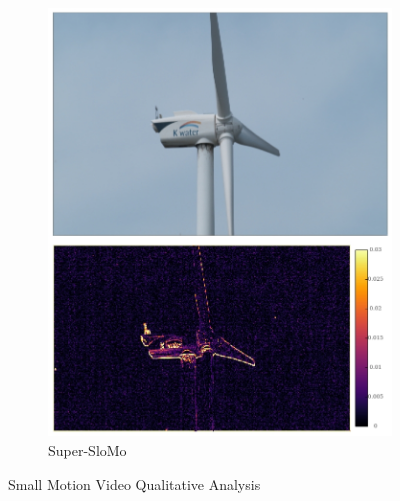 \documentclass{article}
\begin{document}
\begin{figure}
\begin{subfigure}{0.25\textwidth}
\end{subfigure}%
\begin{subfigure}{0.25\textwidth}
	\centering
    \includegraphics[width=1\linewidth]{qua_imgs/TEST02_045_f0465_super.jpg}
    \caption{Super-SloMo}
\end{subfigure}
\caption{Small Motion Video Qualitative Analysis}


\end{figure}
\end{document}
